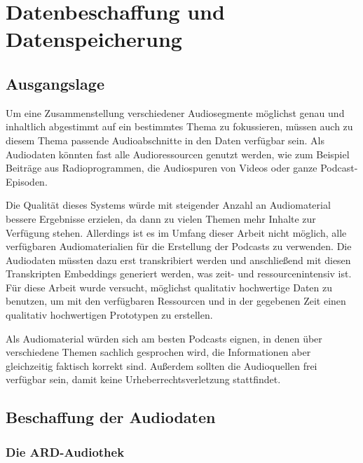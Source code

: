 \chapter{Datenbeschaffung und Datenspeicherung}\label{ch:data}

\section{Ausgangslage}

Um eine Zusammenstellung verschiedener Audiosegmente möglichst genau und inhaltlich abgestimmt auf ein bestimmtes Thema zu fokussieren, müssen auch zu diesem Thema passende Audioabschnitte in den Daten verfügbar sein.
Als Audiodaten könnten fast alle Audioressourcen genutzt werden, wie zum Beispiel Beiträge aus Radioprogrammen, die Audiospuren von Videos oder ganze Podcast-Episoden.

Die Qualität dieses Systems würde mit steigender Anzahl an Audiomaterial bessere Ergebnisse erzielen, da dann zu vielen Themen mehr Inhalte zur Verfügung stehen.
Allerdings ist es im Umfang dieser Arbeit nicht möglich, alle verfügbaren Audiomaterialien für die Erstellung der Podcasts zu verwenden.
Die Audiodaten müssten dazu erst transkribiert werden und anschließend mit diesen Transkripten Embeddings generiert werden, was zeit- und ressourcenintensiv ist.
Für diese Arbeit wurde versucht, möglichst qualitativ hochwertige Daten zu benutzen, um mit den verfügbaren Ressourcen und in der gegebenen Zeit einen qualitativ hochwertigen Prototypen zu erstellen.

Als Audiomaterial würden sich am besten Podcasts eignen, in denen über verschiedene Themen sachlich gesprochen wird, die Informationen aber gleichzeitig faktisch korrekt sind.
Außerdem sollten die Audioquellen frei verfügbar sein, damit keine Urheberrechtsverletzung stattfindet.

\section{Beschaffung der Audiodaten}

\subsection{Die ARD-Audiothek}

